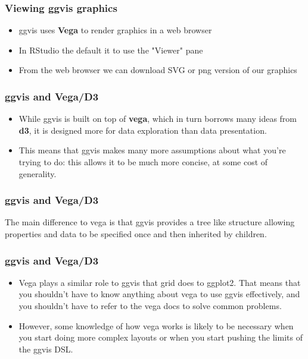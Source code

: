 \documentclass[MASTER.tex]{subfiles}
\begin{document}
 
\begin{frame}
	\frametitle{Viewing ggvis graphics}
	\large
	\begin{itemize}
		\item ggvis uses \textbf{Vega} to render graphics in a web
		browser
		\item In RStudio the default it to use the "Viewer" pane
		\item From the web browser we can download SVG or
		png version of our graphics 
	\end{itemize}
\end{frame}
\begin{frame}
\frametitle{ggvis and Vega/D3}
\begin{itemize}
\item While ggvis is built on top of \textbf{vega}, which in turn borrows many ideas from \textbf{d3}, it is designed more for data 
exploration than data presentation. 
\item This means that ggvis makes many more assumptions about what you’re trying to do: this allows it to be much more concise, at some cost of generality.
\end{itemize}
\end{frame}
\begin{frame}
	\frametitle{ggvis and Vega/D3}
The main difference to vega is that ggvis provides a tree like structure allowing properties and data to 
be specified once and then inherited by children.
\end{frame}
\begin{frame}
\frametitle{ggvis and Vega/D3}
\begin{itemize}
\item Vega plays a similar role to ggvis that grid does to ggplot2. That means that you shouldn’t have to know anything 
about vega to use ggvis effectively, and you shouldn’t have to refer to the vega docs to solve common problems. 
\item However, some knowledge of how vega works is likely to be necessary when you start doing more complex layouts or 
when you start pushing the limits of the ggvis DSL.
\end{itemize}
\end{frame}
\end{document}
